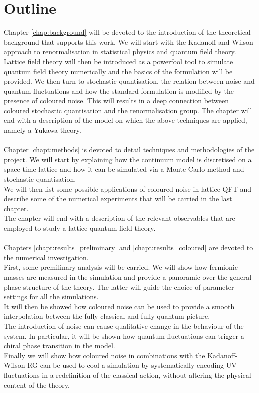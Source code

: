 \newpage 
\section{Outline}
Chapter \ref{chap:background} will be devoted to the introduction of the theoretical background that supports this work. 
We will start with the Kadanoff and Wilson approach to renormalisation in statistical physics and quantum field theory. 
Lattice field theory will then be introduced as a powerfool tool to simulate quantum field theory numerically and the basics of the formulation will be provided. 
We then turn to stochastic quantisation, the relation between noise and quantum fluctuations and how the standard formulation is modified by the presence of coloured noise. 
This will results in a deep connection between coloured stochastic quantisation and the renormalisation group.
The chapter will end with a description of the model on which the above techniques are applied, namely a Yukawa theory. \\~\\
Chapter \ref{chapt:methods} is devoted to detail techniques and methodologies of the project. We will start by explaining how the continuum model is discretised on a space-time lattice and how it can be simulated via a Monte Carlo method and stochastic quantisation. \\
We will then list some possible applications of coloured noise in lattice QFT and describe some of the numerical experiments that will be carried in the last chapter.\\
The chapter will end with a description of the relevant observables that are employed to study a lattice quantum field theory. \\~\\
Chapters \ref{chapt:results_preliminary} and \ref{chapt:results_coloured} are devoted to the numerical investigation. \\
First, some premilinary analysis will be carried. We will show how fermionic masses are measured in the simulation and provide a panoramic over the general phase structure of the theory. The latter will guide the choice of parameter settings for all the simulations. \\
It will then be showed how coloured noise can be used to provide a smooth interpolation between the fully classical and fully quantum picture. \\
The introduction of noise can cause qualitative change in the behaviour of the system. In particular, it will be shown how quantum fluctuations can trigger a chiral phase transition in the model. \\
Finally we will show how coloured noise in combinations with the Kadanoff-Wilson RG can be used to cool a simulation by systematically encoding UV fluctuations in a redefinition of the classical action, without altering the physical content of the theory.